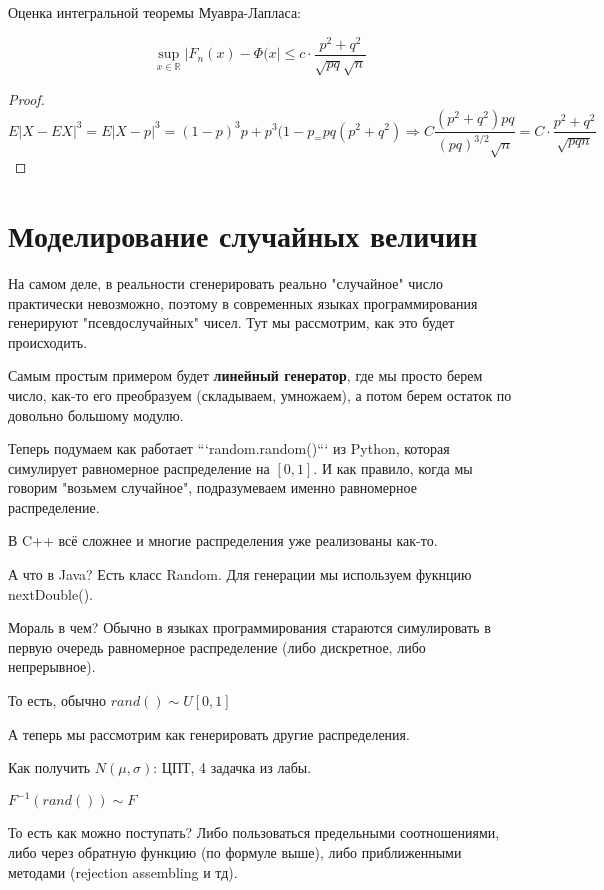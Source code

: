 \documentclass{article}
\begin{document}
   \begin{corollary}
       Оценка интегральной теоремы Муавра-Лапласа:

       $$\sup_{x\in\mathbb R} \left|F_n(x) - \Phi(x\right| \le c \cdot \frac{p^2+q^2}{\sqrt{pq} \sqrt{n}}$$
       \begin{proof}
           $$E\left|X-EX\right|^3 = E\left|X-p\right|^3 = (1-p)^3p + p^3(1-p_ = pq(p^2+q^2) \Rightarrow C \frac{(p^2 + q^2) pq}{(pq)^{3/2}\sqrt{n}} = C \cdot \frac{p^2 + q^2}{\sqrt{pqn}}$$
       \end{proof}
   \end{corollary}
   \section{Моделирование случайных величин}

   На самом деле, в реальности сгенерировать реально "случайное" число практически невозможно, поэтому в современных языках программирования генерируют "псевдослучайных" чисел. Тут мы рассмотрим, как это будет происходить. 

    Самым простым примером будет \textbf{линейный генератор}, где мы просто берем число, как-то его преобразуем (складываем, умножаем), а потом берем остаток по довольно большому модулю.

    Теперь подумаем как работает ```random.random()``` из Python, которая симулирует равномерное распределение на $[0, 1]$. И как правило, когда мы говорим "возьмем случайное", подразумеваем именно равномерное распределение.

    В C++ всё сложнее и многие распределения уже реализованы как-то. 

    А что в Java? Есть класс Random. Для генерации мы используем фукнцию nextDouble().

    Мораль в чем? Обычно в языках программирования стараются симулировать в первую очередь равномерное распределение (либо дискретное, либо непрерывное).
    
    То есть, обычно $rand() \sim U[0, 1]$

    А теперь мы рассмотрим как генерировать другие распределения.

    Как получить $N(\mu, \sigma)$: ЦПТ, 4 задачка из лабы.

    $F^{-1}(rand()) \sim F$

    То есть как можно поступать? Либо пользоваться предельными соотношениями, либо через обратную функцию (по формуле выше), либо приближенными методами (rejection assembling и тд).
\end{document}
